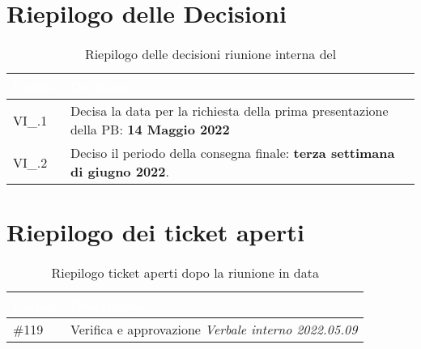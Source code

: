 \section{Riepilogo delle Decisioni}


\begin{table}[!htbp]
    \renewcommand{\arraystretch}{1.5}
    \begin{tabular}{m{}<{\centering}  m{}<{\centering}}
        \rowcolor{darkblue} \textcolor{white}{\textbf{Codice}} & \textcolor{white}{\textbf{Decisione}}                        \\
        \hline
        VI\_{}\D{}.1                                           & Decisa la data per la richiesta della prima presentazione della PB: \textbf{14 Maggio 2022} \\
        VI\_{}\D{}.2											  & Deciso il periodo della consegna finale: \textbf{terza settimana di giugno 2022}.
    \end{tabular}
    \caption{Riepilogo delle decisioni riunione interna del \D}
\end{table}

\section{Riepilogo dei ticket aperti}

\begin{table}[!htbp]
    \renewcommand{\arraystretch}{1.5}
    \begin{tabular}{m{}<{\centering}  m{}<{\centering}}
        \rowcolor{darkblue} \textcolor{white}{\textbf{Codice}} & \textcolor{white}{\textbf{Descrizione}}                        \\
        \hline
        \#{119}                                         & Verifica e approvazione \textit{Verbale interno 2022.05.09} \\
    \end{tabular}
    \caption{Riepilogo ticket aperti dopo la riunione in data \D}
\end{table}

